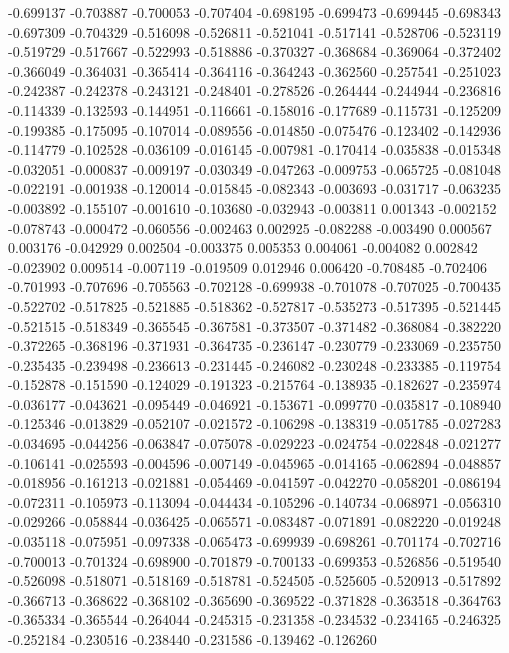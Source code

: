 -0.699137
-0.703887
-0.700053
-0.707404
-0.698195
-0.699473
-0.699445
-0.698343
-0.697309
-0.704329
-0.516098
-0.526811
-0.521041
-0.517141
-0.528706
-0.523119
-0.519729
-0.517667
-0.522993
-0.518886
-0.370327
-0.368684
-0.369064
-0.372402
-0.366049
-0.364031
-0.365414
-0.364116
-0.364243
-0.362560
-0.257541
-0.251023
-0.242387
-0.242378
-0.243121
-0.248401
-0.278526
-0.264444
-0.244944
-0.236816
-0.114339
-0.132593
-0.144951
-0.116661
-0.158016
-0.177689
-0.115731
-0.125209
-0.199385
-0.175095
-0.107014
-0.089556
-0.014850
-0.075476
-0.123402
-0.142936
-0.114779
-0.102528
-0.036109
-0.016145
-0.007981
-0.170414
-0.035838
-0.015348
-0.032051
-0.000837
-0.009197
-0.030349
-0.047263
-0.009753
-0.065725
-0.081048
-0.022191
-0.001938
-0.120014
-0.015845
-0.082343
-0.003693
-0.031717
-0.063235
-0.003892
-0.155107
-0.001610
-0.103680
-0.032943
-0.003811
0.001343
-0.002152
-0.078743
-0.000472
-0.060556
-0.002463
0.002925
-0.082288
-0.003490
0.000567
0.003176
-0.042929
0.002504
-0.003375
0.005353
0.004061
-0.004082
0.002842
-0.023902
0.009514
-0.007119
-0.019509
0.012946
0.006420
-0.708485
-0.702406
-0.701993
-0.707696
-0.705563
-0.702128
-0.699938
-0.701078
-0.707025
-0.700435
-0.522702
-0.517825
-0.521885
-0.518362
-0.527817
-0.535273
-0.517395
-0.521445
-0.521515
-0.518349
-0.365545
-0.367581
-0.373507
-0.371482
-0.368084
-0.382220
-0.372265
-0.368196
-0.371931
-0.364735
-0.236147
-0.230779
-0.233069
-0.235750
-0.235435
-0.239498
-0.236613
-0.231445
-0.246082
-0.230248
-0.233385
-0.119754
-0.152878
-0.151590
-0.124029
-0.191323
-0.215764
-0.138935
-0.182627
-0.235974
-0.036177
-0.043621
-0.095449
-0.046921
-0.153671
-0.099770
-0.035817
-0.108940
-0.125346
-0.013829
-0.052107
-0.021572
-0.106298
-0.138319
-0.051785
-0.027283
-0.034695
-0.044256
-0.063847
-0.075078
-0.029223
-0.024754
-0.022848
-0.021277
-0.106141
-0.025593
-0.004596
-0.007149
-0.045965
-0.014165
-0.062894
-0.048857
-0.018956
-0.161213
-0.021881
-0.054469
-0.041597
-0.042270
-0.058201
-0.086194
-0.072311
-0.105973
-0.113094
-0.044434
-0.105296
-0.140734
-0.068971
-0.056310
-0.029266
-0.058844
-0.036425
-0.065571
-0.083487
-0.071891
-0.082220
-0.019248
-0.035118
-0.075951
-0.097338
-0.065473
-0.699939
-0.698261
-0.701174
-0.702716
-0.700013
-0.701324
-0.698900
-0.701879
-0.700133
-0.699353
-0.526856
-0.519540
-0.526098
-0.518071
-0.518169
-0.518781
-0.524505
-0.525605
-0.520913
-0.517892
-0.366713
-0.368622
-0.368102
-0.365690
-0.369522
-0.371828
-0.363518
-0.364763
-0.365334
-0.365544
-0.264044
-0.245315
-0.231358
-0.234532
-0.234165
-0.246325
-0.252184
-0.230516
-0.238440
-0.231586
-0.139462
-0.126260
